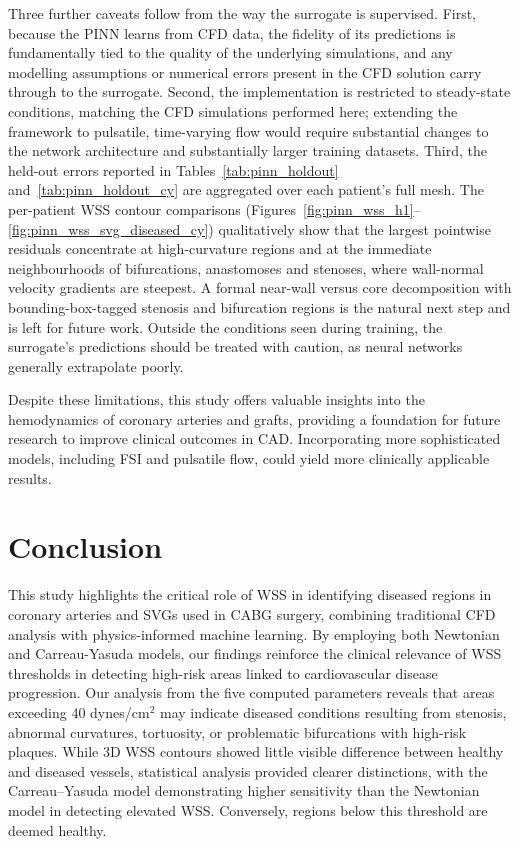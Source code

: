 ﻿\documentclass[12pt,a4paper]{article}
\newcommand{\added}[2][]{\begingroup\color{red}#2\endgroup}
\newcommand{\addp}[1]{\added{#1}}
\theoremstyle{definition}
\numberwithin{equation}{section}
\begin{document}
\addp{Three further caveats follow from the way the surrogate is supervised. First, because the PINN learns from CFD data, the fidelity of its predictions is fundamentally tied to the quality of the underlying simulations, and any modelling assumptions or numerical errors present in the CFD solution carry through to the surrogate. Second, the implementation is restricted to steady-state conditions, matching the CFD simulations performed here; extending the framework to pulsatile, time-varying flow would require substantial changes to the network architecture and substantially larger training datasets. Third, the held-out errors reported in Tables~\ref{tab:pinn_holdout} and~\ref{tab:pinn_holdout_cy} are aggregated over each patient's full mesh. The per-patient WSS contour comparisons (Figures~\ref{fig:pinn_wss_h1}--\ref{fig:pinn_wss_svg_diseased_cy}) qualitatively show that the largest pointwise residuals concentrate at high-curvature regions and at the immediate neighbourhoods of bifurcations, anastomoses and stenoses, where wall-normal velocity gradients are steepest. A formal near-wall versus core decomposition with bounding-box-tagged stenosis and bifurcation regions is the natural next step and is left for future work. Outside the conditions seen during training, the surrogate's predictions should be treated with caution, as neural networks generally extrapolate poorly.}

Despite these limitations, this study offers valuable insights into the hemodynamics of coronary arteries and grafts, providing a foundation for future research to improve clinical outcomes in CAD. Incorporating more sophisticated models, including FSI and pulsatile flow, could yield more clinically applicable results. 

\section{\label{Conclusion}Conclusion} 
\hspace*{\parindent} 
This study highlights the critical role of WSS in identifying diseased regions in coronary arteries and SVGs used in CABG surgery, {combining traditional CFD analysis with physics-informed machine learning}. By employing both Newtonian and Carreau-Yasuda models, our findings reinforce the clinical relevance of WSS thresholds in detecting high-risk areas linked to cardiovascular disease progression. Our analysis from the five computed parameters reveals that areas exceeding 40 dynes/cm$^2$ may indicate diseased conditions resulting from stenosis, abnormal curvatures, tortuosity, or problematic bifurcations with high-risk plaques. While 3D WSS contours showed little visible difference between healthy and diseased vessels, statistical analysis provided clearer distinctions, with the Carreau–Yasuda model demonstrating higher sensitivity than the Newtonian model in detecting elevated WSS. Conversely, regions below this threshold are deemed healthy. 
\end{document}
